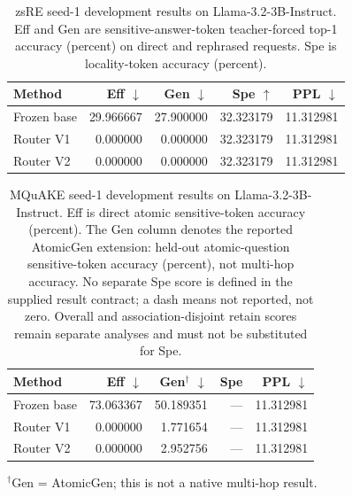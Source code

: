 \documentclass{article}
\begin{document}
\begin{table}[t]
\centering
\small
\caption{zsRE seed-1 development results on Llama-3.2-3B-Instruct.
Eff and Gen are sensitive-answer-token teacher-forced top-1 accuracy (percent)
on direct and rephrased requests. Spe is locality-token accuracy (percent).
}
\label{tab:zsre-seed1-eff-gen-spe-ppl}
\begin{tabular}{@{}lrrrr@{}}
\toprule
Method & Eff $\downarrow$ & Gen $\downarrow$ & Spe $\uparrow$ & PPL $\downarrow$ \\
\midrule
Frozen base & 29.966667 & 27.900000 & 32.323179 & 11.312981 \\
Router V1   & 0.000000 & 0.000000 & 32.323179 & 11.312981 \\
Router V2   & 0.000000 & 0.000000 & 32.323179 & 11.312981 \\
\bottomrule
\end{tabular}
\end{table}

\begin{table}[t]
\centering
\small
\caption{MQuAKE seed-1 development results on Llama-3.2-3B-Instruct.
Eff is direct atomic sensitive-token accuracy (percent).
The Gen column denotes the reported AtomicGen extension: held-out
atomic-question sensitive-token accuracy (percent), not multi-hop accuracy.
No separate Spe score is defined in the supplied result contract; a dash means
not reported, not zero. Overall and association-disjoint retain scores remain
separate analyses and must not be substituted for Spe.}
\label{tab:mquake-seed1-eff-gen-spe-ppl}
\begin{tabular}{@{}lrrrr@{}}
\toprule
Method & Eff $\downarrow$ & Gen$^{\dagger}$ $\downarrow$ & Spe & PPL $\downarrow$ \\
\midrule
Frozen base & 73.063367 & 50.189351 & --- & 11.312981 \\
Router V1   & 0.000000 & 1.771654 & --- & 11.312981 \\
Router V2   & 0.000000 & 2.952756 & --- & 11.312981 \\
\bottomrule
\end{tabular}
\par\smallskip
\begin{minipage}{0.98\linewidth}
\footnotesize $^{\dagger}$Gen = AtomicGen; this is not a native multi-hop result.
\end{minipage}
\end{table}
\end{document}
